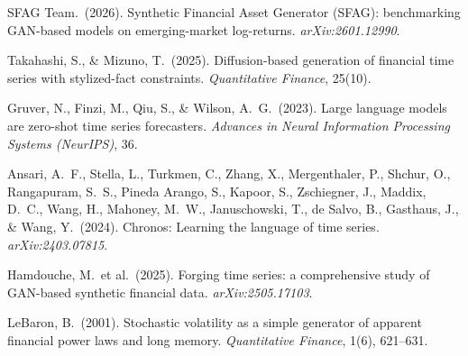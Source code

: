 \documentclass[10pt]{article}
\begin{document}
{\begin{enumerate}[label={\textbf{[\arabic*]}},leftmargin=2.8em,itemsep=5pt,parsep=0pt,topsep=2pt]
\item \hypertarget{R:28}{}%
  SFAG Team.\ (2026).
  Synthetic Financial Asset Generator (SFAG): benchmarking GAN-based models on
  emerging-market log-returns.
  \textit{arXiv:2601.12990}.

\item \hypertarget{R:29}{}%
  Takahashi, S., \& Mizuno, T.\ (2025).
  Diffusion-based generation of financial time series with stylized-fact constraints.
  \textit{Quantitative Finance}, 25(10).

\item \hypertarget{R:30}{}%
  Gruver, N., Finzi, M., Qiu, S., \& Wilson, A.\ G.\ (2023).
  Large language models are zero-shot time series forecasters.
  \textit{Advances in Neural Information Processing Systems (NeurIPS)}, 36.

\item \hypertarget{R:31}{}%
  Ansari, A.\ F., Stella, L., Turkmen, C., Zhang, X., Mergenthaler, P., Shchur, O.,
  Rangapuram, S.\ S., Pineda Arango, S., Kapoor, S., Zschiegner, J., Maddix, D.\ C.,
  Wang, H., Mahoney, M.\ W., Januschowski, T., de Salvo, B., Gasthaus, J., \& Wang, Y.\ (2024).
  Chronos: Learning the language of time series.
  \textit{arXiv:2403.07815}.

\item \hypertarget{R:32}{}%
  Hamdouche, M.\ et al.\ (2025).
  Forging time series: a comprehensive study of GAN-based synthetic financial data.
  \textit{arXiv:2505.17103}.

\item \hypertarget{R:33}{}%
  LeBaron, B.\ (2001).
  Stochastic volatility as a simple generator of apparent financial power laws and long memory.
  \textit{Quantitative Finance}, 1(6), 621--631.

\end{enumerate}
}
\end{document}
